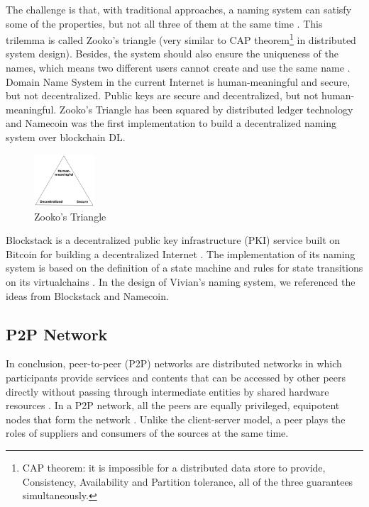 The challenge is that, with traditional approaches, a naming system can satisfy some of the properties, but not all three of them at the same time \cite{wilcox2001names}. This trilemma is called Zooko's triangle \cite{swartz_2011} (very similar to CAP theorem\footnote{CAP theorem: it is impossible for a distributed data store to provide, Consistency, Availability and Partition tolerance, all of the three guarantees simultaneously.} in distributed system design).
Besides, the system should also ensure the uniqueness of the names, which means two different users cannot create and use the same name \cite{ali2017blockstack}.
Domain Name System in the current Internet is human-meaningful and secure, but not decentralized. Public keys are secure and decentralized, but not human-meaningful.
Zooko's Triangle has been squared by distributed ledger technology \cite{swartz_2011} and Namecoin was the first implementation to build a decentralized naming system over blockchain DL.

\begin{figure}[h]
    \centering
    \includegraphics[width=0.2\textwidth,trim={0 0 0 0},clip]{figs/zooko_triangle.png}
    \caption{Zooko's Triangle}
    \label{fig:zooko_triangle}
\end{figure}

Blockstack is a decentralized public key infrastructure (PKI) service built on Bitcoin for building a decentralized Internet \cite{ali2017blockstack}.
The implementation of its naming system is based on the definition of a state machine and rules for state transitions on its virtualchains \cite{nelson2016extending, ali2016blockstack}.
In the design of Vivian's naming system, we referenced the ideas from Blockstack and Namecoin.

\subsection{P2P Network}

In conclusion, peer-to-peer (P2P) networks are distributed networks in which participants provide services and contents that can be accessed by other peers directly without passing through intermediate entities by shared hardware resources \cite{990434}.
In a P2P network, all the peers are equally privileged, equipotent nodes that form the network \cite{nemat2011taking}. Unlike the client-server model, a peer plays the roles of suppliers and consumers of the sources at the same time.

